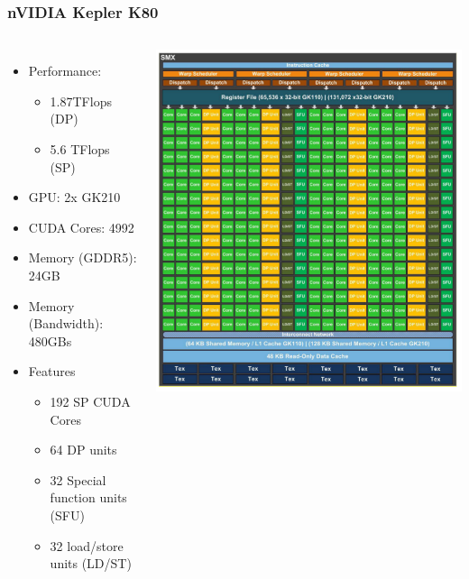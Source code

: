 \documentclass[10pt,t]{beamer}
\begin{document}
\begin{frame}
\frametitle{nVIDIA Kepler K80}
\begin{columns}[c]
\begin{itemize}
\item Performance: 
\begin{itemize}
\item 1.87TFlops (DP)
\item 5.6 TFlops (SP)
\end{itemize}
\item GPU: 2x GK210
\item CUDA Cores: 4992
\item Memory (GDDR5): 24GB
\item Memory (Bandwidth): 480GBs
\item Features
\begin{itemize}
\item 192 SP CUDA Cores
\item 64 DP units
\item 32 Special function units (SFU)
\item 32 load/store units (LD/ST)
\end{itemize}
\end{itemize}
\includegraphics[width=\textwidth]{./GK210-110}
\end{columns}
\end{frame}
\end{document}

